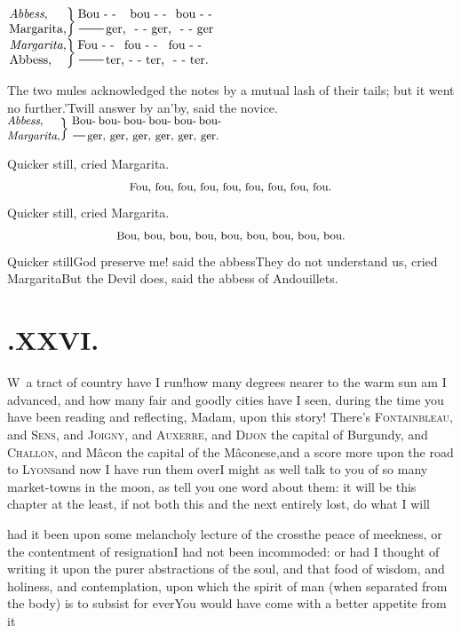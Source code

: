\documentclass{article}
\begin{document}
\noindent$
\left.\vcenter{\halign{#\hss\cr
\textit{Abbess},\cr 
Margarita,\cr}}\right\}
\vcenter{\halign{&#\hss\cr
Bou - - &bou - - &bou - -\cr
\tsh ger, &\hbox to 14pt{ - -} ger, &\hbox to 14pt{ - -} ger\cr}}
$\\[4pt]
$
\left.\vcenter{\halign{#\hss\cr
\textit{Margarita},\cr 
Abbess,\cr}}\right\}
\vcenter{\halign{&#\hss\cr
Fou - - &fou - - &fou - -\cr
\tsh ter,&\hbox to 14pt{ - -} ter, &\hbox to 14pt{ - -} ter.\cr}}
$

\newpage
The two mules acknowledged the notes by a mutual lash of their tails; but it went no
further.\tsh ’Twill answer by an’\break by, said the novice.\\[6pt]
$
\left.\!\vcenter{\halign{\small #\hss\cr
\textit{Abbess},\cr 
\textit{Margarita},\cr}}\right\}$\,$
\vcenter{\halign{\hbox to 119pt{\small #}\cr
Bou- bou- bou- bou- bou- bou-\cr
\tsk ger, ger, ger, ger, ger, ger.\cr}}$

Quicker still, cried Margarita.
$$\hbox{\small Fou, fou, fou, fou, fou, fou, fou, fou, fou.}$$
\quad Quicker still, cried Margarita.
$$\hbox{\small Bou, bou, bou, bou, bou, bou, bou, bou, bou.}$$
\quad Quicker still\tsk God preserve me! said the abbess\tsk They do not
understand us, cried Margarita\tsh But the Devil does, said the abbess
of Andouillets.

\newpage\null\smallskip
\section{.\enspace XXVI.}

\lettrine{W}{\,} a tract of country have I
run!\tsk how many degrees nearer to the warm sun am I advanced,
and how many fair and goodly cities have I seen, during the time
you have been reading and reflecting, Madam, upon this story!
There’s \textsc{Fontainbleau}, and \textsc{Sens},
and \textsc{Joigny}, and \textsc{Auxerre}, and
\textsc{Dijon} the capital of Burgundy, and
\textsc{Challon}, and Mâcon the capital of the
Mâconese,\break and a score more upon the road to
\textsc{Lyons}\tsh and now I have run them
over\tsh I might as well talk to you of so many market-towns in the moon, as tell
you one word about them: it will be this chapter at the least, if not both this\pb
and the next entirely lost, do what I will\tsh

\noindent
{}

\noindent
{}\break
had it been upon some melancholy lecture of the
cross\tsk the peace of meekness, or the contentment of
resignation\tsh I had not been incommoded: or had I thought of writing
it upon the purer abstractions of the soul, and that food of wisdom,
and holiness, and contemplation, upon which the spirit of man (when
separated from the body) is to subsist for ever\tsh You
would have come with a better appetite from it\tsh
\end{document}
